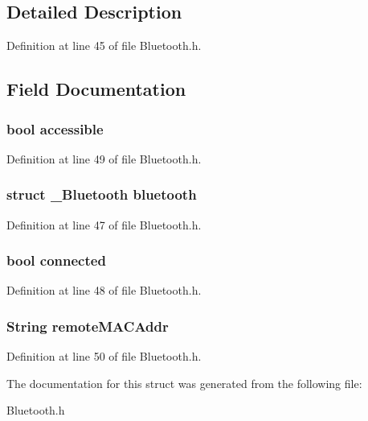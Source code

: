\subsection{Detailed Description}


Definition at line 45 of file Bluetooth.\-h.



\subsection{Field Documentation}
\hypertarget{structBluetoothExtends_a348a5a495aba2753e3e5e5d013f1c612}{
\subsubsection[{accessible}]{\setlength{\rightskip}{0pt plus 5cm}bool accessible}}\label{structBluetoothExtends_a348a5a495aba2753e3e5e5d013f1c612}


Definition at line 49 of file Bluetooth.\-h.

\hypertarget{structBluetoothExtends_afe4e56b7ac932d03957e2c38f209f55c}{
\subsubsection[{bluetooth}]{\setlength{\rightskip}{0pt plus 5cm}struct {\bf \-\_\-\-Bluetooth} bluetooth}}\label{structBluetoothExtends_afe4e56b7ac932d03957e2c38f209f55c}


Definition at line 47 of file Bluetooth.\-h.

\hypertarget{structBluetoothExtends_ab36823025f12a809217f7771125658c2}{
\subsubsection[{connected}]{\setlength{\rightskip}{0pt plus 5cm}bool connected}}\label{structBluetoothExtends_ab36823025f12a809217f7771125658c2}


Definition at line 48 of file Bluetooth.\-h.

\hypertarget{structBluetoothExtends_a473f43fc5e8e19c1221c16e6fac3cb63}{
\subsubsection[{remote\-M\-A\-C\-Addr}]{\setlength{\rightskip}{0pt plus 5cm}String remote\-M\-A\-C\-Addr}}\label{structBluetoothExtends_a473f43fc5e8e19c1221c16e6fac3cb63}


Definition at line 50 of file Bluetooth.\-h.



The documentation for this struct was generated from the following file\-:\begin{DoxyCompactItemize}
\item 
Bluetooth.\-h\end{DoxyCompactItemize}
